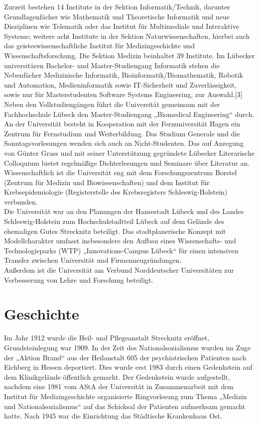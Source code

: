 \documentclass[a4paper]{article}
\begin{document}
\noindent Zurzeit bestehen 14 Institute in der Sektion Informatik/Technik, darunter Grundlagenfächer wie Mathematik und Theoretische Informatik und neue Disziplinen wie Telematik oder das Institut für Multimediale und Interaktive Systeme; weitere acht Institute in der Sektion Naturwissenschaften, hierbei auch das geisteswissenschaftliche Institut für Medizingeschichte und Wissenschaftsforschung. Die Sektion Medizin beinhaltet 39 Institute. Im Lübecker universitären Bachelor- und Master-Studiengang Informatik stehen die Nebenfächer Medizinische Informatik, Bioinformatik/Biomathematik, Robotik und Automation, Medieninformatik sowie IT-Sicherheit und Zuverlässigkeit, sowie nur für Masterstudenten Software Systems Engineering, zur Auswahl.[3]\\

\noindent Neben den Vollstudiengängen führt die Universität gemeinsam mit der Fachhochschule Lübeck den Master-Studiengang „Biomedical Engineering“ durch. An der Universität besteht in Kooperation mit der Fernuniversität Hagen ein Zentrum für Fernstudium und Weiterbildung. Das Studium Generale und die Sonntagsvorlesungen wenden sich auch an Nicht-Studenten. Das auf Anregung von Günter Grass und mit seiner Unterstützung gegründete Lübecker Literarische Colloquium bietet regelmäßige Dichterlesungen und Seminare über Literatur an.\\

\noindent Wissenschaftlich ist die Universität eng mit dem Forschungszentrum Borstel (Zentrum für Medizin und Biowissenschaften) und dem Institut für Krebsepidemiologie (Registerstelle des Krebsregisters Schleswig-Holstein) verbunden.\\

\noindent Die Universität war an den Planungen der Hansestadt Lübeck und des Landes Schleswig-Holstein zum Hochschulstadtteil Lübeck auf dem Gelände des ehemaligen Gutes Strecknitz beteiligt. Das stadtplanerische Konzept mit Modellcharakter umfasst insbesondere den Aufbau eines Wissenschafts- und Technologieparks (WTP) „Innovations-Campus Lübeck“ für einen intensiven Transfer zwischen Universität und Firmenneugründungen.\\

\noindent Außerdem ist die Universität am Verbund Norddeutscher Universitäten zur Verbesserung von Lehre und Forschung beteiligt.
\newpage
\section{Geschichte}
Im Jahr 1912 wurde die Heil- und Pflegeanstalt Strecknitz eröffnet, Grundsteinlegung war 1909. In der Zeit des Nationalsozialismus wurden im Zuge der „Aktion Brand“ aus der Heilanstalt 605 der psychiatrischen Patienten nach Eichberg in Hessen deportiert. Dies wurde erst 1983 durch einen Gedenkstein auf dem Klinikgelände öffentlich gemacht. Der Gedenkstein wurde aufgestellt, nachdem eine 1981 vom AStA der Universität in Zusammenarbeit mit dem Institut für Medizingeschichte organisierte Ringvorlesung zum Thema „Medizin und Nationalsozialismus“ auf das Schicksal der Patienten aufmerksam gemacht hatte. Nach 1945 war die Einrichtung das Städtische Krankenhaus Ost.\\
\end{document}
